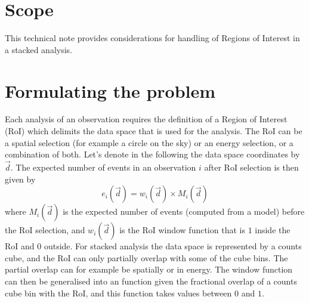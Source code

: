 \documentclass{article}[12pt,a4]
\begin{document}
\frontpage


\section{Scope}

This technical note provides considerations for handling of Regions of Interest in a stacked
analysis.


\section{Formulating the problem}

Each analysis of an observation requires the definition of a Region of Interest (RoI) which delimits
the data space that is used for the analysis.
The RoI can be a spatial selection (for example a circle on the sky) or an energy selection, or a
combination of both.
Let's denote in the following the data space coordinates by $\vec{d}$.
The expected number of events in an observation $i$ after RoI selection is then given by
\begin{equation}
e_i(\vec{d}) = w_i(\vec{d}) \times M_i(\vec{d})
\end{equation}
where $M_i(\vec{d})$ is the expected number of events (computed from a model) before the
RoI selection, and $w_i(\vec{d})$ is the RoI window function that is $1$ inside the RoI and $0$ 
outside.
For stacked analysis the data space is represented by a counts cube, and the RoI can only partially
overlap with some of the cube bins.
The partial overlap can for example be spatially or in energy.
The window function can then be generalised into an function given the fractional overlap of a
counts cube bin with the RoI, and this function takes values between $0$ and $1$.
\end{document}
